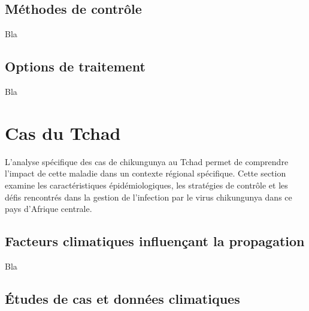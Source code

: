 \subsection{Méthodes de contrôle}

Bla

\subsection{Options de traitement}

Bla

\section{Cas du Tchad}

L'analyse spécifique des cas de chikungunya au Tchad permet de comprendre l'impact de cette maladie dans un contexte régional spécifique. Cette section examine les caractéristiques épidémiologiques, les stratégies de contrôle et les défis rencontrés dans la gestion de l'infection par le virus chikungunya dans ce pays d'Afrique centrale.
\subsection{Facteurs climatiques influençant la propagation}

Bla

\subsection{Études de cas et données climatiques}
